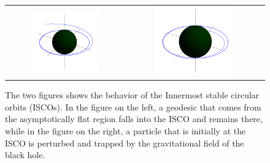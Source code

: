 \begin{figure}
\centering
\hspace*{-0.275\textwidth}
\begin{tabular}{cc}
\includegraphics[width=0.6\textwidth]{img/Chapter4/ISCO1.png}&
\includegraphics[width=0.6\textwidth]{img/Chapter4/ISCO2.png}\\
\end{tabular}
\caption{The two figures shows the behavior of the Innermost stable circular orbits (ISCOs). In the figure on the left, a geodesic that comes from the asymptotically flat region falls into the ISCO and remains there, while in the figure on the right, a particle that is initially at the ISCO is perturbed and trapped by the gravitational field of the black hole.}
\end{figure}

\clearpage

